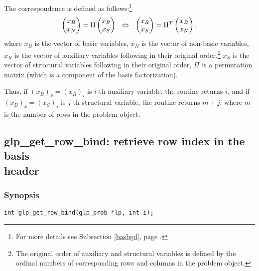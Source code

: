 The correspondence is defined as follows:\footnote{For more details see
Subsection \ref{basbgd}, page \pageref{basbgd}.}
$$\left(\begin{array}{@{}c@{}}x_B\\x_N\\\end{array}\right)=
\Pi\left(\begin{array}{@{}c@{}}x_R\\x_S\\\end{array}\right)
\ \ \Leftrightarrow
\ \ \left(\begin{array}{@{}c@{}}x_R\\x_S\\\end{array}\right)=
\Pi^T\left(\begin{array}{@{}c@{}}x_B\\x_N\\\end{array}\right),$$
where $x_B$ is the vector of basic variables, $x_N$ is the vector of
non-basic variables, $x_R$ is the vector of auxiliary variables
following in their original order,\footnote{The original order of
auxiliary and structural variables is defined by the ordinal numbers
of corresponding rows and columns in the problem object.} $x_S$ is the
vector of structural variables following in their original order, $\Pi$
is a permutation matrix (which is a component of the basis
factorization).

Thus, if $(x_B)_k=(x_R)_i$ is $i$-th auxiliary variable, the routine
returns $i$, and if $(x_B)_k=(x_S)_j$ is $j$-th structural variable,
the routine returns $m+j$, where $m$ is the number of rows in the
problem object.


\newpage

\subsection{glp\_get\_row\_bind: retrieve row index in the basis\\
header}

\subsubsection*{Synopsis}

\begin{verbatim}
int glp_get_row_bind(glp_prob *lp, int i);
\end{verbatim}

